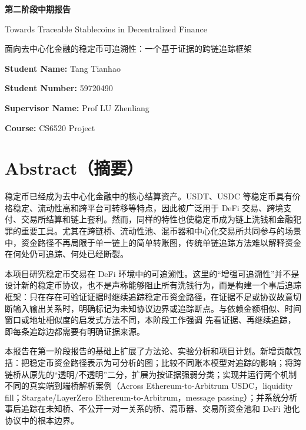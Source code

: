 \documentclass[12pt,a4paper]{ctexart}
\begin{document}
\begin{titlepage}\centering\vspace*{2cm}
{\Huge\bfseries 第二阶段中期报告\par}\vspace{1.5cm}
{\huge Towards Traceable Stablecoins in Decentralized Finance\par}\vspace{0.6cm}
{\large 面向去中心化金融的稳定币可追溯性：一个基于证据的跨链追踪框架\par}\vfill
{\large \textbf{Student Name:} Tang Tianhao\par}\vspace{0.4cm}
{\large \textbf{Student Number:} 59720490\par}\vspace{1.2cm}
{\large \textbf{Supervisor Name:} Prof LU Zhenliang\par}\vspace{0.4cm}
{\large \textbf{Course:} CS6520 Project\par}\vspace{1.5cm}
\end{titlepage}
\newpage\tableofcontents\thispagestyle{empty}\newpage\setcounter{page}{1}

\hypertarget{ux6458ux8981}{%
\section*{Abstract（摘要）}\label{ux6458ux8981}}

稳定币已经成为去中心化金融中的核心结算资产。USDT、USDC
等稳定币具有价格稳定、流动性高和跨平台可转移等特点，因此被广泛用于 DeFi
交易、跨境支付、交易所结算和链上套利。然而，同样的特性也使稳定币成为链上洗钱和金融犯罪的重要工具。尤其在跨链桥、流动性池、混币器和中心化交易所共同参与的场景中，资金路径不再局限于单一链上的简单转账图，传统单链追踪方法难以解释资金在何处仍可追踪、何处已经断裂。

本项目研究稳定币交易在 DeFi
环境中的可追溯性。这里的``增强可追溯性''并不是设计新的稳定币协议，也不是声称能够阻止所有洗钱行为，而是构建一个事后追踪框架：只在存在可验证证据时继续追踪稳定币资金路径，在证据不足或协议故意切断输入输出关系时，明确标记为未知协议边界或追踪断点。与依赖金额相似、时间窗口或地址相似度的启发式方法不同，本阶段工作强调
先看证据、再继续追踪，即每条追踪边都需要有明确证据来源。

本报告在第一阶段报告的基础上扩展了方法论、实验分析和项目计划。新增贡献包括：把稳定币资金路径表示为可分析的图；比较不同账本模型对追踪的影响；将跨链桥从原先的“透明/不透明”二分，扩展为按证据强弱分类；实现并运行两个机制不同的真实端到端桥解析案例（Across
Ethereum-to-Arbitrum USDC，liquidity fill；Stargate/LayerZero
Ethereum-to-Arbitrum，message passing）；并系统分析事后追踪在未知桥、不公开一对一关系的桥、混币器、交易所资金池和 DeFi 池化协议中的根本边界。
\end{document}
